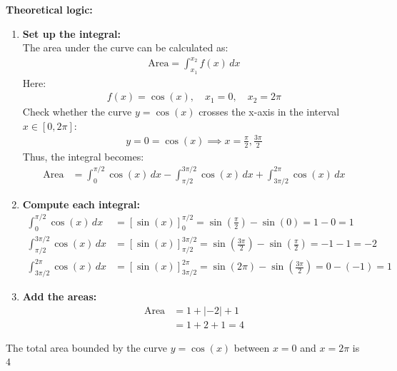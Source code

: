 \documentclass[journal]{IEEEtran}
\begin{document}
\textbf{Theoretical logic:}
\begin{enumerate}
    \item \textbf{Set up the integral:} \\
    The area under the curve can be calculated as:
    \begin{align}
        \text{Area} = \int_{x_1}^{x_2} f(x) \, dx
    \end{align}
    Here:
    \begin{align}
        f(x) = \cos(x), \quad x_1 = 0, \quad x_2 = 2\pi
    \end{align}
    Check whether the curve \( y = \cos(x) \) crosses the x-axis in the interval \( x \in [0, 2\pi] \):
    \begin{align}
        y = 0 = \cos(x) \implies x = \frac{\pi}{2}, \frac{3\pi}{2}
    \end{align}
    Thus, the integral becomes:
    \begin{align}
        \text{Area} &= \int_0^{\pi/2} \cos(x) \, dx 
        - \int_{\pi/2}^{3\pi/2} \cos(x) \, dx 
        + \int_{3\pi/2}^{2\pi} \cos(x) \, dx
    \end{align}
    
    \item \textbf{Compute each integral:}
    \begin{align}
        \int_0^{\pi/2} \cos(x) \, dx &= \left[\sin(x)\right]_0^{\pi/2} = \sin\left(\frac{\pi}{2}\right) - \sin(0) = 1 - 0 = 1 \\
        \int_{\pi/2}^{3\pi/2} \cos(x) \, dx &= \left[\sin(x)\right]_{\pi/2}^{3\pi/2} = \sin\left(\frac{3\pi}{2}\right) - \sin\left(\frac{\pi}{2}\right) = -1 - 1 = -2 \\
        \int_{3\pi/2}^{2\pi} \cos(x) \, dx &= \left[\sin(x)\right]_{3\pi/2}^{2\pi} = \sin(2\pi) - \sin\left(\frac{3\pi}{2}\right) = 0 - (-1) = 1
    \end{align}

    \item \textbf{Add the areas:}
    \begin{align}
        \text{Area} &= 1 + |{-2}| + 1 \\
        &= 1 + 2 + 1 = 4
    \end{align}
\end{enumerate}

The total area bounded by the curve \( y = \cos(x) \) between \( x = 0 \) and \( x = 2\pi \) is $4$
\end{document}
